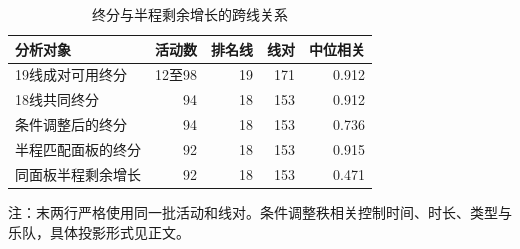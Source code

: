 \begin{table}[!htbp]
\centering\small
\caption{终分与半程剩余增长的跨线关系}\label{tab:correlations}
\setlength{\tabcolsep}{4pt}
\renewcommand{\arraystretch}{1.15}
\begin{tabularx}{\linewidth}{L r r r r}
\toprule
分析对象 & 活动数 & 排名线 & 线对 & 中位相关 \\
\midrule
19线成对可用终分 & 12至98 & 19 & 171 & 0.912 \\
18线共同终分 & 94 & 18 & 153 & 0.912 \\
条件调整后的终分 & 94 & 18 & 153 & 0.736 \\
半程匹配面板的终分 & 92 & 18 & 153 & 0.915 \\
同面板半程剩余增长 & 92 & 18 & 153 & 0.471 \\
\bottomrule
\end{tabularx}
\par\vspace{4pt}
\begin{minipage}{\linewidth}\footnotesize{}
注：末两行严格使用同一批活动和线对。条件调整秩相关控制时间、时长、类型与乐队，具体投影形式见正文。
\end{minipage}
\end{table}

